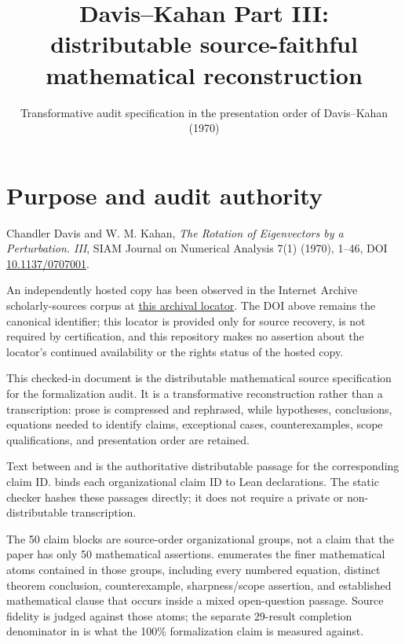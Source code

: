 
\title{Davis--Kahan Part III: distributable source-faithful mathematical reconstruction}
\author{}
\date{Transformative audit specification in the presentation order of Davis--Kahan (1970)}

\maketitle

\section*{Purpose and audit authority}
\begin{sourceguide}
\item[Primary source] Chandler Davis and W. M. Kahan, \emph{The Rotation of Eigenvectors by a Perturbation. III}, SIAM Journal on Numerical Analysis 7(1) (1970), 1--46, DOI \href{https://doi.org/10.1137/0707001}{10.1137/0707001}.
\item[Archival locator] An independently hosted copy has been observed in the Internet Archive scholarly-sources corpus at \href{https://ia600108.us.archive.org/view_archive.php?archive=/24/items/wikipedia-scholarly-sources-corpus/10.1137.zip\&file=10.1137\%252F0707001.pdf}{this archival locator}.  The DOI above remains the canonical identifier; this locator is provided only for source recovery, is not required by certification, and this repository makes no assertion about the locator's continued availability or the rights status of the hosted copy.
\item[Role of this file] This checked-in document is the distributable mathematical source specification for the formalization audit.  It is a transformative reconstruction rather than a transcription: prose is compressed and rephrased, while hypotheses, conclusions, equations needed to identify claims, exceptional cases, counterexamples, scope qualifications, and presentation order are retained.
\item[Audit markers] Text between  and  is the authoritative distributable passage for the corresponding claim ID.   binds each organizational claim ID to Lean declarations.  The static checker hashes these passages directly; it does not require a private or non-distributable transcription.
\item[Atomic completeness denominator] The 50 claim blocks are source-order organizational groups, not a claim that the paper has only 50 mathematical assertions.   enumerates the finer mathematical atoms contained in those groups, including every numbered equation, distinct theorem conclusion, counterexample, sharpness/scope assertion, and established mathematical clause that occurs inside a mixed open-question passage.  Source fidelity is judged against those atoms; the separate 29-result completion denominator in  is what the 100\% formalization claim is measured against.

\end{sourceguide}
